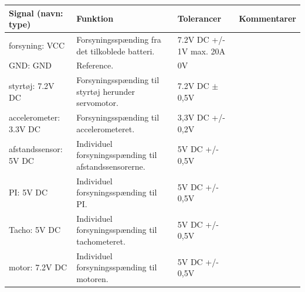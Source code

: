 \begin{table}[h]
	\centering
	\begin{tabularx}{\textwidth}{|l|X|X|X|} \hline
	\textbf{Signal (navn: type)} & \textbf{Funktion} & \textbf{Tolerancer} & \textbf{Kommentarer} \\ \hline
forsyning: VCC
	& Forsyningsspænding fra det tilkoblede batteri. 
	& 7.2V DC +/- 1V max. 20A
 	& ~
	\\ \hline
	
GND: GND
	& Reference. 
	& 0V
 	& ~
	\\ \hline
	
styrtøj: 7.2V DC
	& Forsyningsspænding til styrtøj herunder servomotor. 
	& 7.2V DC $\pm$ 0,5V %
 	& ~
	\\ \hline
	
accelerometer: 3.3V DC
	& Forsyningsspænding til accelerometeret.
	& 3,3V DC +/- 0,2V %
 	& ~
	\\ \hline
	
afstandssensor: 5V DC
	& Individuel forsyningsspænding til afstandssensorerne.
	& 5V DC +/- 0,5V %
 	& ~
	\\ \hline
	
PI: 5V DC
	& Individuel forsyningsspænding til PI.
	& 5V DC +/- 0,5V %
 	& ~
	\\ \hline
	
Tacho: 5V DC
	& Individuel forsyningsspænding til tachometeret.
	& 5V DC +/- 0,5V %
 	& ~
	\\ \hline
	
motor: 7.2V DC
	& Individuel forsyningsspænding til motoren.
	& 5V DC +/- 0,5V %
 	& ~
	\\ \hline
	\end{tabularx}
\end{table}


\clearpage

\clearpage

\clearpage

\clearpage


